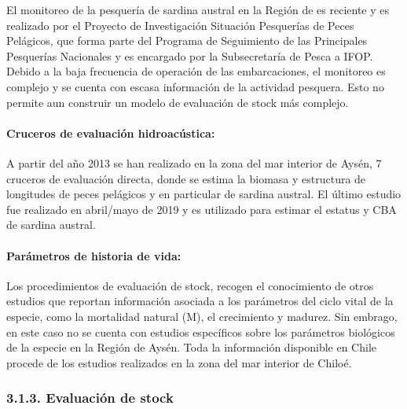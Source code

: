 \documentclass[
  spanish,
]{article}
\begin{document}
\quad

El monitoreo de la pesquería de sardina austral en la Región de es
reciente y es realizado por el Proyecto de Investigación Situación
Pesquerías de Peces Pelágicos, que forma parte del Programa de
Seguimiento de las Principales Pesquerías Nacionales y es encargado por
la Subsecretaría de Pesca a IFOP. Debido a la baja frecuencia de
operación de las embarcaciones, el monitoreo es complejo y se cuenta con
escasa información de la actividad pesquera. Esto no permite aun
construir un modelo de evaluación de stock más complejo.

\hypertarget{cruceros-de-evaluaciuxf3n-hidroacuxfastica}{%
\paragraph{Cruceros de evaluación
hidroacústica:}\label{cruceros-de-evaluaciuxf3n-hidroacuxfastica}}

\quad

A partir del año 2013 se han realizado en la zona del mar interior de
Aysén, 7 cruceros de evaluación directa, donde se estima la biomasa y
estructura de longitudes de peces pelágicos y en particular de sardina
austral. El último estudio fue realizado en abril/mayo de 2019 y es
utilizado para estimar el estatus y CBA de sardina austral.

\vspace{0.9cm}

\hypertarget{paruxe1metros-de-historia-de-vida}{%
\paragraph{Parámetros de historia de
vida:}\label{paruxe1metros-de-historia-de-vida}}

\quad

Los procedimientos de evaluación de stock, recogen el conocimiento de
otros estudios que reportan información asociada a los parámetros del
ciclo vital de la especie, como la mortalidad natural (M), el
crecimiento y madurez. Sin embrago, en este caso no se cuenta con
estudios específicos sobre los parámetros biológicos de la especie en la
Región de Aysén. Toda la información disponible en Chile procede de los
estudios realizados en la zona del mar interior de Chiloé.

\hypertarget{evaluaciuxf3n-de-stock}{%
\subsubsection{3.1.3. Evaluación de
stock}\label{evaluaciuxf3n-de-stock}}
\end{document}
